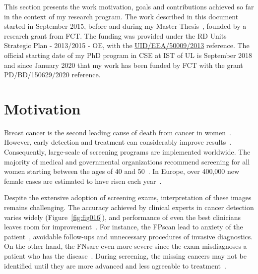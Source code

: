 \clearpage
\label{chap:chap001}
\noindent

This section presents the work motivation, goals and contributions achieved so far in the context of my research program.
The work described in this document started in September 2015, before and during my Master Thesis~\cite{calisto2017mimbcdui}, founded by a research grant from \ac{FCT}.
The funding was provided under the \ac{RD} Units Strategic Plan - 2013/2015 - \ac{OE}, with the \href{https://www.fct.pt/apoios/projectos/consulta/vglobal_projecto.phtml.en?idProjecto=147329&idElemConcurso=8999}{UID/EEA/50009/2013} reference.
The official starting date of my \ac{PhD} program in \ac{CSE} at \ac{IST} of \ac{UL} is September 2018 and since January 2020 that my work has been funded by \ac{FCT} with the grant PD/BD/150629/2020 reference.

\section{Motivation}
\label{sec:chap001001}

Breast cancer is the second leading cause of death from cancer in women~\cite{https://doi.org/10.3322/caac.21754}.
However, early detection and treatment can considerably improve results~\cite{Seely2018, doi:10.1002/cncr.32859, 10.1093/jnci/djaa080}.
Consequently, large-scale of screening programs are implemented worldwide.
The majority of medical and governmental organizations recommend screening for all women starting between the ages of 40 and 50~\cite{Oeffinger2015, Koczkodaj2019}.
In Europe, over 400,000 new female cases are estimated to have risen each year~\cite{Dafni2019}.

Despite the extensive adoption of screening exams, interpretation of these images remains challenging.
The accuracy achieved by clinical experts in cancer detection varies widely (Figure~\ref{fig:fig016}), and performance of even the best clinicians leaves room for improvement~\cite{KIM2020e138, 10.1001/jamainternmed.2015.5231}.
For instance, the \acp{FP}\footnotemark[1] can lead to anxiety of the patient~\cite{10.1001/jamainternmed.2014.981}, avoidable follow-ups and unnecessary procedures of invasive diagnostics.
On the other hand, the \acp{FN}\footnotemark[2] are even more severe since the exam misdiagnoses a patient who has the disease~\cite{doi:10.1056/NEJMe1912943}.
During screening, the missing cancers may not be identified until they are more advanced and less agreeable to treatment~\cite{Houssami2017}.

